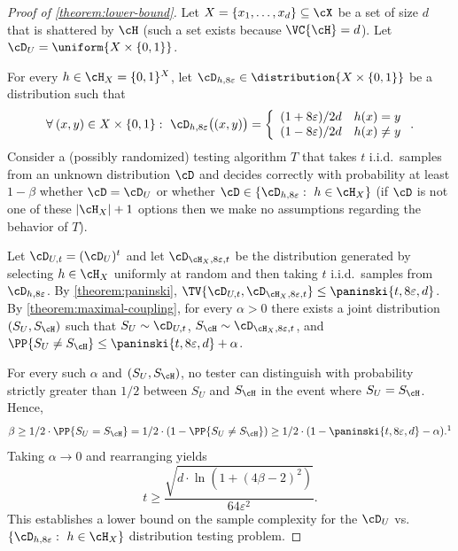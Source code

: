 \documentclass{toc}
\begin{document}
\begin{proof}[Proof of \cref{theorem:lower-bound}]
	Let $X = \{x_1,\dots,x_d\} \subseteq \cX$ be a set of size $d$ that is shattered by $\cH$ (such a set exists because $\VC{\cH} = d$). Let $\cD_U = \uniform{X \times \{0,1\}}$. 
	
	For every $h \in \cH_X = \{0,1\}^X$, let $\cD_{h,8\varepsilon} \in \distribution{X \times \{0,1\}}$ be a distribution such that
	\[
		\forall \: (x,y) \in X \times \{0,1\}: ~ 
		\cD_{h,8\varepsilon}\big((x,y)\big) 
		=
		\left\{
		\begin{array}{ll}
			(1 + 8\varepsilon)/2d & h(x) = y \\
			(1 - 8\varepsilon)/2d & h(x) \neq y
		\end{array}
		\right..
	\]
	Consider a (possibly randomized) testing algorithm $T$ that takes $t$ i.i.d.\ samples from an unknown distribution $\cD$ and decides correctly with probability at least $1-\beta$ whether $\cD = \cD_U$ or whether $\cD \in \{\cD_{h,8\varepsilon}: ~ h \in \cH_X\}$ (if $\cD$ is not one of these $|\cH_X|+1$ options then we make no assumptions regarding the behavior of $T$).
	
	Let $\cD_{U,t} = (\cD_{U})^t$ and let $\cD_{\cH_X,8\varepsilon,t}$ be the distribution generated by selecting $h \in \cH_X$ uniformly at random and then taking $t$ i.i.d.\ samples from $\cD_{h,8\varepsilon}$.
	By \cref{theorem:paninski}, $\TV{\cD_{U,t}, \cD_{\cH_X,8\varepsilon,t}} \leq \paninski{t,8\varepsilon,d}$.
	By \cref{theorem:maximal-coupling}, for every $\alpha > 0$ there exists a joint distribution $(S_U,S_\cH)$ such that $S_U \sim \cD_{U,t}$, $S_\cH \sim \cD_{\cH_X,8\varepsilon,t}$, and $\PP{S_U \neq S_\cH} \leq \paninski{t,8\varepsilon,d} + \alpha$.


	For every such $\alpha$ and $(S_U,S_\cH)$, no tester can distinguish with probability strictly greater than $1/2$ between $S_U$ and $S_\cH$ in the event where $S_U = S_\cH$. 
	Hence,
	\begin{align*}
		\beta
		\geq
		1/2 \cdot \PP{S_U = S_\cH}
		=
		1/2 \cdot(1 - \PP{S_U \neq S_\cH})
		\geq
		1/2 \cdot (1-\paninski{t,8\varepsilon,d} - \alpha).\footnotemark
	\end{align*}
	Taking $\alpha \to 0$ and rearranging yields
	\begin{equation}\label{eq:testing-lower-bound-for-Dh}
		t \geq \frac{\sqrt{d \cdot \ln(1 + (4\beta - 2)^2)}}{64\varepsilon^2}.
	\end{equation}
	This establishes a lower bound on the sample complexity for the $\cD_U$ vs.\ $\{\cD_{h,8\varepsilon}: ~ h \in \cH_X\}$ distribution testing problem. 
	

\end{proof}
\end{document}
